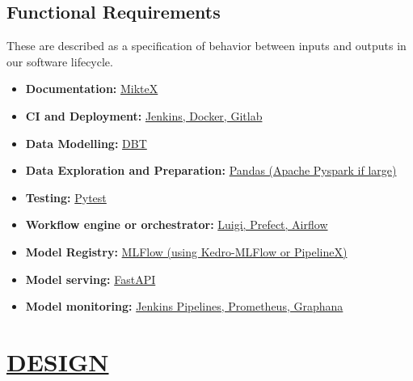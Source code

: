 \documentclass[12pt,oneside,a4paper]{report}
\begin{document}
\section{Functional Requirements}
These are described as a specification of behavior between inputs and outputs in our software lifecycle.
\begin{itemize}
\item 	 \textbf{Documentation:} \underline{MikteX}
\item    \textbf{CI and Deployment:} \underline{Jenkins, Docker, Gitlab}
\item    \textbf{Data Modelling:} \underline{DBT}
\item    \textbf{Data Exploration and Preparation:} \underline{Pandas (Apache Pyspark if large)}
\item    \textbf{Testing:} \underline{Pytest}
\item    \textbf{Workflow engine or orchestrator:} \underline{Luigi, Prefect, Airflow}
\item    \textbf{Model Registry:} \underline{MLFlow (using Kedro-MLFlow or PipelineX)}
\item    \textbf{Model serving:} \underline{FastAPI}
\item    \textbf{Model monitoring:} \underline{Jenkins Pipelines, Prometheus, Graphana}
\end{itemize}


\chapter{\underline{DESIGN}}
\end{document}
